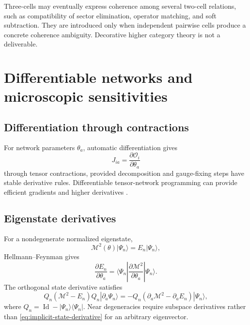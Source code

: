 \documentclass[11pt]{article}
\newcommand{\Id}{\operatorname{Id}}
\newcommand{\cO}{\mathcal O}
\newcommand{\cM}{\mathcal M}
\begin{document}
Three-cells may eventually express coherence among several two-cell relations,
such as compatibility of sector elimination, operator matching, and soft
subtraction.  They are introduced only when independent pairwise cells produce
a concrete coherence ambiguity.  Decorative higher category theory is not a
deliverable.

\section{Differentiable networks and microscopic sensitivities}
\label{sec:differentiation}

\subsection{Differentiation through contractions}

For network parameters \(\theta_a\), automatic differentiation gives
\begin{equation}
 J_{ia}
 =
 \frac{\partial\cO_i}{\partial\theta_a}
\label{eq:tn-jacobian}
\end{equation}
through tensor contractions, provided decomposition and gauge-fixing steps have
stable derivative rules.  Differentiable tensor-network programming can
provide efficient gradients and higher derivatives
\cite{Liao2019}.

\subsection{Eigenstate derivatives}

For a nondegenerate normalized eigenstate,
\begin{equation}
 \cM^2(\theta)|\Psi_n\rangle
 =E_n|\Psi_n\rangle,
\label{eq:eigenproblem-derivative}
\end{equation}
Hellmann--Feynman gives
\begin{equation}
 \frac{\partial E_n}{\partial\theta_a}
 =
 \langle\Psi_n|
 \frac{\partial\cM^2}{\partial\theta_a}
 |\Psi_n\rangle.
\label{eq:hellmann-feynman}
\end{equation}
The orthogonal state derivative satisfies
\begin{equation}
 Q_n
 \left(\cM^2-E_n\right)
 Q_n
 |\partial_a\Psi_n\rangle
 =
 -Q_n
 \left(
 \partial_a\cM^2-\partial_a E_n
 \right)
 |\Psi_n\rangle,
\label{eq:implicit-state-derivative}
\end{equation}
where \(Q_n=\Id-|\Psi_n\rangle\langle\Psi_n|\).  Near degeneracies require
subspace derivatives rather than \cref{eq:implicit-state-derivative} for an
arbitrary eigenvector.
\end{document}
